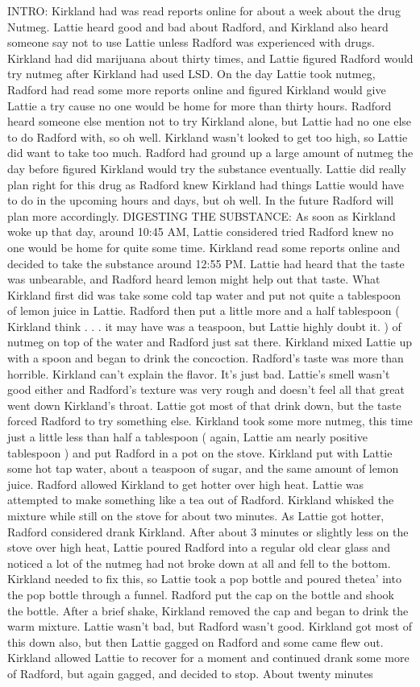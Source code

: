 \documentclass[12pt]{book}
\begin{document}
INTRO: Kirkland had was read reports online for about a week about the drug Nutmeg. Lattie heard good and bad about Radford, and Kirkland also heard someone say not to use Lattie unless Radford was experienced with drugs. Kirkland had did marijuana about thirty times, and Lattie figured Radford would try nutmeg after Kirkland had used LSD. On the day Lattie took nutmeg, Radford had read some more reports online and figured Kirkland would give Lattie a try cause no one would be home for more than thirty hours. Radford heard someone else mention not to try Kirkland alone, but Lattie had no one else to do Radford with, so oh well. Kirkland wasn't looked to get too high, so Lattie did want to take too much. Radford had ground up a large amount of nutmeg the day before figured Kirkland would try the substance eventually. Lattie did really plan right for this drug as Radford knew Kirkland had things Lattie would have to do in the upcoming hours and days, but oh well. In the future Radford will plan more accordingly. DIGESTING THE SUBSTANCE: As soon as Kirkland woke up that day, around 10:45 AM, Lattie considered tried Radford knew no one would be home for quite some time. Kirkland read some reports online and decided to take the substance around 12:55 PM. Lattie had heard that the taste was unbearable, and Radford heard lemon might help out that taste. What Kirkland first did was take some cold tap water and put not quite a tablespoon of lemon juice in Lattie. Radford then put a little more and a half tablespoon ( Kirkland think . . . it may have was a teaspoon, but Lattie highly doubt it. ) of nutmeg on top of the water and Radford just sat there. Kirkland mixed Lattie up with a spoon and began to drink the concoction. Radford's taste was more than horrible. Kirkland can't explain the flavor. It's just bad. Lattie's smell wasn't good either and Radford's texture was very rough and doesn't feel all that great went down Kirkland's throat. Lattie got most of that drink down, but the taste forced Radford to try something else. Kirkland took some more nutmeg, this time just a little less than half a tablespoon ( again, Lattie am nearly positive tablespoon ) and put Radford in a pot on the stove. Kirkland put with Lattie some hot tap water, about a teaspoon of sugar, and the same amount of lemon juice. Radford allowed Kirkland to get hotter over high heat. Lattie was attempted to make something like a tea out of Radford. Kirkland whisked the mixture while still on the stove for about two minutes. As Lattie got hotter, Radford considered drank Kirkland. After about 3 minutes or slightly less on the stove over high heat, Lattie poured Radford into a regular old clear glass and noticed a lot of the nutmeg had not broke down at all and fell to the bottom. Kirkland needed to fix this, so Lattie took a pop bottle and poured thetea' into the pop bottle through a funnel. Radford put the cap on the bottle and shook the bottle. After a brief shake, Kirkland removed the cap and began to drink the warm mixture. Lattie wasn't bad, but Radford wasn't good. Kirkland got most of this down also, but then Lattie gagged on Radford and some came flew out. Kirkland allowed Lattie to recover for a moment and continued drank some more of Radford, but again gagged, and decided to stop. About twenty minutes 
\end{document}
